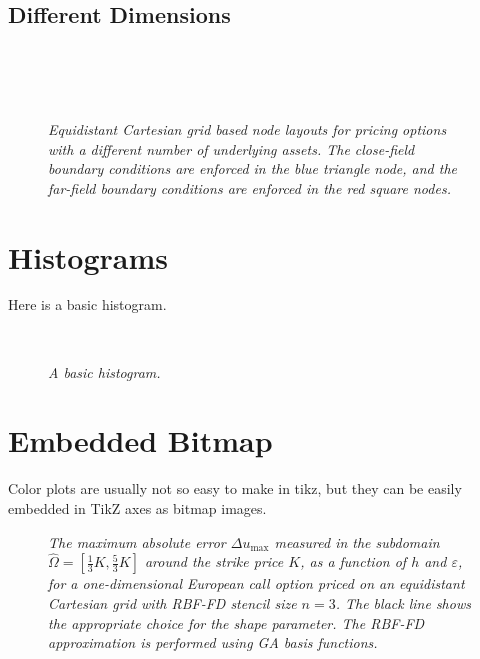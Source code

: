 \documentclass[11pt, oneside]{article}   	%
\begin{document}
\subsection{Different Dimensions}
\begin{figure}[H]
\centering
\\
\vspace{11pt}
\\
\vspace{11pt}
\\
\caption{\emph{Equidistant Cartesian grid based node layouts for pricing options with a different number of underlying assets. The close-field boundary conditions are enforced in the blue triangle node, and the far-field boundary conditions are enforced in the red square nodes.}}
\label{fig:gridreg}
\end{figure}

\newpage
\section{Histograms}
Here is a basic histogram.
\begin{figure}[H]
\centering
\\
\caption{\emph{A basic histogram.}}
\label{fig:hist}
\end{figure}

\newpage
\section{Embedded Bitmap}
Color plots are usually not so easy to make in tikz, but they can be easily embedded in TikZ axes as bitmap images. 
\begin{figure}[H]
\centering


\caption{\emph{The maximum absolute error $\Delta u_{\max}$ measured in the subdomain $\hat\Omega=[\frac{1}{3}K,\frac{5}{3}K]$ around the strike price $K$, as a function of $h$ and $\varepsilon$, for a one-dimensional European call option priced on an equidistant Cartesian grid with RBF-FD stencil size $n=3$. The black line shows the appropriate choice for the shape parameter. The RBF-FD approximation is performed using GA basis functions.}}
\label{fig:contour1}
\end{figure}
\end{document}
